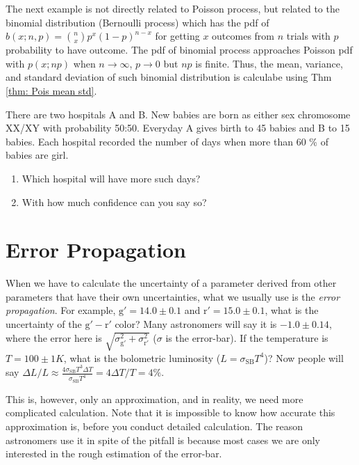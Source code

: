 The next example is not directly related to Poisson process, but related to the binomial distribution (Bernoulli process) which has the pdf of $ b(x; n, p) = \binom{n}{x} p^x (1 - p)^{n - x} $ for getting $ x $ outcomes from $ n $ trials with $ p $ probability to have outcome. The pdf of binomial process approaches Poisson pdf with $ p(x; np) $ when $ n \rightarrow \infty $, $ p \rightarrow 0 $ but $ np $ is finite. Thus, the mean, variance, and standard deviation of such binomial distribution is calculabe using Thm \ref{thm: Pois mean std}.
\begin{ex}
There are two hospitals A and B. New babies are born as either sex chromosome XX/XY with probability 50:50. Everyday A gives birth to 45 babies and B to 15 babies. Each hospital recorded the number of days when more than 60 \% of babies are girl.
\begin{enumerate}
\item Which hospital will have more such days?
\item With how much confidence can you say so?
\end{enumerate}
\end{ex}


\section{Error Propagation}
When we have to calculate the uncertainty of a parameter derived from other parameters that have their own uncertainties, what we usually use is the \textit{error propagation}. For example, $ \mathrm{g'} = 14.0 \pm 0.1 $ and $ \mathrm{r'} = 15.0 \pm 0.1 $, what is the uncertainty of the $ \mathrm{g' - r'} $ color? Many astronomers will say it is $ -1.0 \pm 0.14 $, where the error here is $ \sqrt{\sigma_\mathrm{g'}^2 + \sigma_\mathrm{r'}^2} $ ($ \sigma $ is the error-bar). If the temperature is $ T = 100 \pm 1 \si{K} $, what is the bolometric luminosity ($ L = \sigma_\mathrm{SB} T^4 $)? Now people will say $ \Delta L / L \approx \frac{4 \sigma_\mathrm{SB} T^3 \Delta T }{\sigma_\mathrm{SB} T^4} = 4 \Delta T / T = 4 \% $. 

This is, however, only an approximation, and in reality, we need more complicated calculation. Note that it is impossible to know how accurate this approximation is, before you conduct detailed calculation. The reason astronomers use it in spite of the pitfall is because most cases we are only interested in the rough estimation of the error-bar.




